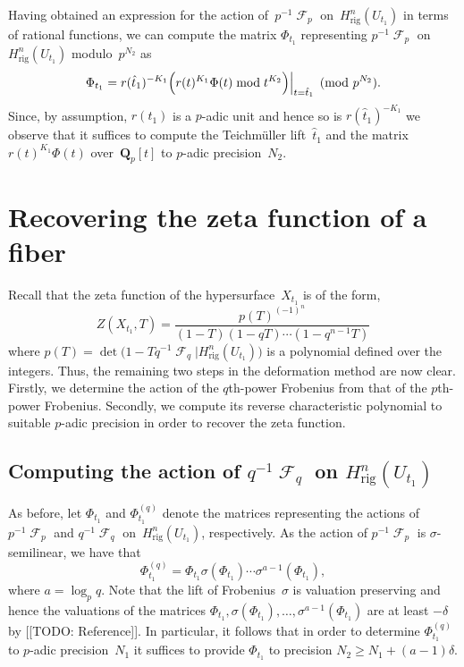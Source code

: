 \documentclass[a4paper,11pt]{article}
\numberwithin{equation}{section}
\DeclareMathOperator{\Frob}{\mathcal{F}} %
\providecommand{\Hrig}{H_{\text{rig}}}  %
\theoremstyle{definition}
\begin{document}
Having obtained an expression for the action of~$p^{-1} \Frob_p$ 
on~$\Hrig^{n}(U_{t_1})$ in terms of rational functions, we can 
compute the matrix $\Phi_{t_1}$ representing $p^{-1} \Frob_p$ on 
$\Hrig^{n}(U_{t_1})$ modulo~$p^{N_2}$ as 
\begin{equation}
\Phi_{t_1} = 
    r(\hat{t}_1)^{-K_1} 
    \Bigl( r(t)^{K_1} \Phi(t) \bmod{t^{K_2}} \Bigr) \Big\vert_{t=\hat{t}_1} \pmod{p^{N_2}}.
\end{equation}
Since, by assumption, $r(t_1)$ is a $p$-adic unit and hence so is 
$r(\hat{t}_1)^{-K_1}$ we observe that it suffices to compute the 
Teichm\"uller lift~$\hat{t}_1$ and the matrix~$r(t)^{K_1} \Phi(t)$ 
over~$\mathbf{Q}_p[t]$ to $p$-adic precision~$N_2$.


\section{Recovering the zeta function of a fiber}
\label{sec:ZetaFunctions}

Recall that the zeta function of the hypersurface~$X_{t_1}$ is of the form,
\begin{equation}
Z(X_{t_1},T) = \frac{p(T)^{(-1)^n}}{(1 - T) (1 - qT) \dotsm (1 - q^{n-1}T)}
\end{equation}
where $p(T) = \det \bigl( 1 - T q^{-1} \Frob_q | \Hrig^n(U_{t_1}) \bigr)$ 
is a polynomial defined over the integers.
Thus, the remaining two steps in the deformation method are now clear.  
Firstly, we determine the action of the $q$th-power Frobenius 
from that of the $p$th-power Frobenius.  Secondly, we compute 
its reverse characteristic polynomial to suitable \mbox{$p$-adic} 
precision in order to recover the zeta function.

\subsection{Computing the action of $q^{-1} \Frob_q$ on $\Hrig^{n}(U_{t_1})$}

As before, let $\Phi_{t_1}$ and $\Phi_{t_1}^{(q)}$ denote the matrices 
representing the actions of $p^{-1} \Frob_p$ and $q^{-1} \Frob_q$ 
on~$\Hrig^{n}(U_{t_1})$, respectively.  As the action of $p^{-1} \Frob_p$ 
is $\sigma$-semilinear, we have that 
\begin{equation}
\Phi_{t_1}^{(q)} = 
    \Phi_{t_1} \sigma(\Phi_{t_1}) \dotsm \sigma^{a-1}(\Phi_{t_1}),
\end{equation}
where $a = \log_p q$.  Note that the lift of Frobenius~$\sigma$ 
is valuation preserving and hence the valuations of the matrices 
$\Phi_{t_1}, \sigma(\Phi_{t_1}), \dotsc, \sigma^{a-1}(\Phi_{t_1})$ 
are at least $-\delta$ by [[TODO: Reference]].
In particular, it follows that in order to determine $\Phi_{t_1}^{(q)}$ 
to $p$-adic precision~$N_1$ it suffices to provide $\Phi_{t_1}$ to 
precision $N_2 \geq N_1 + (a-1) \delta$.
\end{document}
